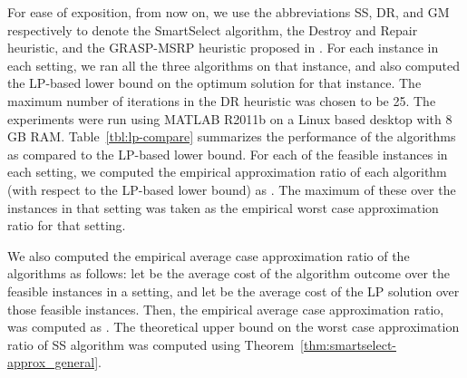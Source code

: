 \documentclass[conference]{IEEEtran}
\begin{document}
For ease of exposition, from now on, we use the abbreviations SS, DR, and GM respectively to denote the SmartSelect algorithm, the Destroy and Repair heuristic, and the GRASP-MSRP heuristic proposed in \cite{sitanayah}. For each instance in each setting, we ran all the three algorithms on that instance, and also computed the LP-based lower bound on the optimum solution for that instance. The maximum number of iterations in the DR heuristic was chosen to be 25. The experiments were run using MATLAB R2011b on a Linux based desktop with 8 GB RAM. Table~\ref{tbl:lp-compare} summarizes the performance of the algorithms as compared to the LP-based lower bound. For each of the feasible instances in each setting, we computed the empirical approximation ratio of each algorithm (with respect to the LP-based lower bound) as . 
The maximum of these over the instances in that setting was taken as the empirical worst case approximation ratio for that setting. 

We also computed the empirical average case approximation ratio of the algorithms as follows: let  be the average cost of the algorithm outcome over the feasible instances in a setting, and let  be the average cost of the LP solution over those feasible instances. Then, the empirical average case approximation ratio,  was computed as . The theoretical upper bound on the worst case approximation ratio of SS algorithm was computed using Theorem~\ref{thm:smartselect-approx_general}.
\end{document}
